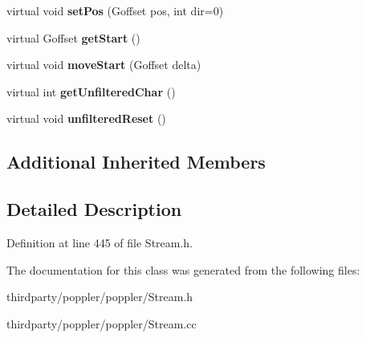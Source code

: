 \begin{DoxyCompactItemize}
virtual void {\bfseries set\+Pos} (Goffset pos, int dir=0)
\item 
\mbox{\label{class_file_stream_ac401ba3eb1bb31bc81a3a757c2480287}} 
virtual Goffset {\bfseries get\+Start} ()
\item 
\mbox{\label{class_file_stream_a67fac8d9b3aad3f3b3a393802ace759b}} 
virtual void {\bfseries move\+Start} (Goffset delta)
\item 
\mbox{\label{class_file_stream_a443f357d96fb08e6093542dbf852879d}} 
virtual int {\bfseries get\+Unfiltered\+Char} ()
\item 
\mbox{\label{class_file_stream_a29a7d86907c4fcd083bd62416e21c666}} 
virtual void {\bfseries unfiltered\+Reset} ()
\end{DoxyCompactItemize}
\subsection*{Additional Inherited Members}


\subsection{Detailed Description}


Definition at line 445 of file Stream.\+h.



The documentation for this class was generated from the following files\+:\begin{DoxyCompactItemize}
\item 
thirdparty/poppler/poppler/Stream.\+h\item 
thirdparty/poppler/poppler/Stream.\+cc\end{DoxyCompactItemize}
